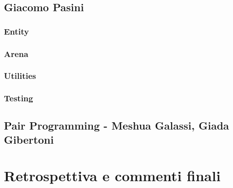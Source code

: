         
        \section{Giacomo Pasini}\label{sec:pasini}
            
            \subsection{Entity}\label{subsec:pasini:entity}
                
            \subsection{Arena}\label{subsec:pasini:arena}
                
            \subsection{Utilities}\label{subsec:pasini:utilities}
                
            \subsection{Testing}\label{subsec:pasini:testing}
                
        
        \section{Pair Programming - Meshua Galassi, Giada Gibertoni}\label{sec:pairprogramming}
            
            
    \clearpage

    \chapter{Retrospettiva e commenti finali}\label{ch:retrospective}
        
        

